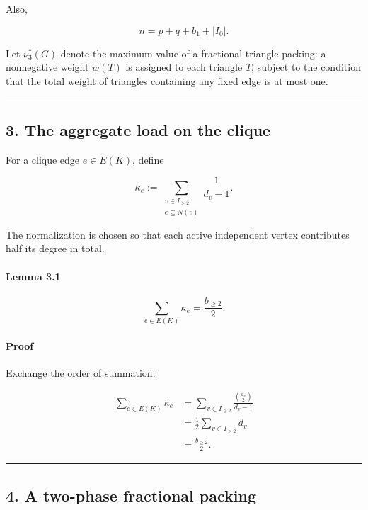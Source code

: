 \documentclass[
  american,
  11pt,
  a4paper,
]{article}
\begin{document}
Also,

\[
n=p+q+b_1+|I_0|.
\tag{2.2}
\]

Let \(\nu_3^*(G)\) denote the maximum value of a fractional triangle packing: a nonnegative weight \(w(T)\) is assigned to each triangle \(T\), subject to the condition that the total weight of triangles containing any fixed edge is at most one.

\begin{center}\rule{0.5\linewidth}{0.5pt}\end{center}

\subsection{3. The aggregate load on the clique}\label{the-aggregate-load-on-the-clique}

For a clique edge \(e\in E(K)\), define

\[
\kappa_e
:=
\sum_{\substack{v\in I_{\ge2}\\ e\subseteq N(v)}}
\frac{1}{d_v-1}.
\tag{3.1}
\]

The normalization is chosen so that each active independent vertex contributes half its degree in total.

\paragraph{Lemma 3.1}\label{lemma-3.1}

\[
\sum_{e\in E(K)}\kappa_e
=
\frac{b_{\ge2}}2.
\]

\paragraph{Proof}\label{proof}

Exchange the order of summation:

\[
\begin{aligned}
\sum_{e\in E(K)}\kappa_e
&=
\sum_{v\in I_{\ge2}}
\frac{\binom{d_v}{2}}{d_v-1}\\
&=
\frac12
\sum_{v\in I_{\ge2}}d_v\\
&=
\frac{b_{\ge2}}2.
\end{aligned}
\]

\begin{center}\rule{0.5\linewidth}{0.5pt}\end{center}

\subsection{4. A two-phase fractional packing}\label{a-two-phase-fractional-packing}
\end{document}
